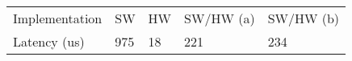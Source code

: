 
\begin{tabular}{lllll}
\hline\noalign{\smallskip}
Implementation & SW & HW & SW/HW (a) & SW/HW (b) \\
\noalign{\smallskip}
Latency (us) & 975 & 18 & 221 & 234 \\
\hline
\end{tabular}
